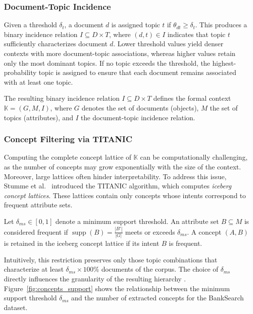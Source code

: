 \subsubsection{Document-Topic Incidence}
Given a threshold $\delta_t$, a document $d$ is assigned topic $t$ if $\theta_{dt} \geq \delta_t$. 
This produces a binary incidence relation $I \subseteq D \times T$, where $(d, t) \in I$ indicates that topic $t$ sufficiently characterizes document $d$. 
Lower threshold values yield denser contexts with more document-topic associations, whereas higher values retain only the most dominant topics.
If no topic exceeds the threshold, the highest-probability topic is assigned to ensure that each document remains associated with at least one topic.

The resulting binary incidence relation $I \subseteq D \times T$ defines the formal context $\mathbb{K}=(G,M,I)$, where $G$ denotes the set of documents (objects), $M$ the set of topics (attributes), and $I$ the document-topic incidence relation.


\subsubsection{Concept Filtering via TITANIC}

Computing the complete concept lattice of $\mathbb{K}$ can be computationally challenging, as the number of concepts may grow exponentially with the size of the context. 
Moreover, large lattices often hinder interpretability.
To address this issue, Stumme et al.~\cite{stumme_titanic_2002} introduced the TITANIC algorithm, which computes \emph{iceberg concept lattices}. 
These lattices contain only concepts whose intents correspond to frequent attribute sets.

Let $\delta_{ms} \in [0,1]$ denote a minimum support threshold. 
An attribute set $B \subseteq M$ is considered frequent if $\operatorname{supp}(B) = \frac{\left| B' \right|}{\left| G \right|}$ meets or exceeds $\delta_{ms}$. 
A concept $(A,B)$ is retained in the iceberg concept lattice if its intent $B$ is frequent.

Intuitively, this restriction preserves only those topic combinations that characterize at least $\delta_{ms} \times 100\%$ documents of the corpus. 
The choice of $\delta_{ms}$ directly influences the granularity of the resulting hierarchy \cite{gutekunst2025conceptual}.
Figure~\ref{fig:concepts_support} shows the relationship between the minimum support threshold $\delta_{ms}$ and the number of extracted concepts for the BankSearch dataset. 


